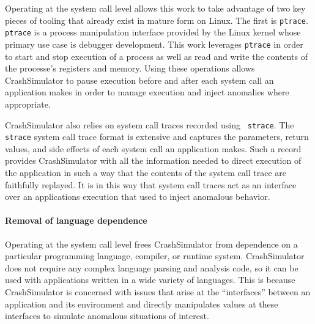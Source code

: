         Operating at the system call level allows this work to take advantage of
        two key pieces of tooling that already exist in mature form on Linux.
        The first is {\tt ptrace}. {\tt ptrace} is a process manipulation interface provided
        by the Linux kernel whose primary use case is debugger development.
        This work leverages {\tt ptrace} in order to start and stop execution of a
        process as well as read and write the contents of the processe's
        registers and memory.  Using these operations allows CrashSimulator to
        pause execution before and after each system call an application makes
        in order to manage execution and inject anomalies where appropriate.

        CrashSimulator also relies on system call traces recorded using {\tt
          strace}.  The {\tt strace} system call trace format is extensive and
        captures the parameters, return values, and side effects of each system
        call an application makes.  Such a record provides CrashSimulator with
        all the information needed to direct execution of the application in
        such a way that the contents of the system call trace are faithfully
        replayed.  It is in this way that system call traces act as an interface
        over an applications execution that used to inject anomalous behavior.

        \paragraph{Removal of language dependence}

        Operating at the system call level frees CrashSimulator from
        dependence on a particular programming language, compiler, or runtime system.  
	CrashSimulator does not require any complex language parsing and
        analysis code, %
	so it can be used with applications written in a wide variety of languages.
	This is because CrashSimulator is concerned with issues that arise
        at the ``interfaces'' between an application and its environment
	and directly manipulates values at these interfaces to simulate
	anomalous situations of interest.

